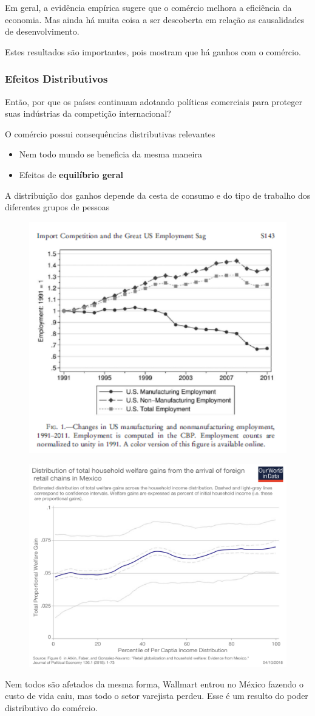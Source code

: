 \documentclass[a4paper,12pt]{article}[abntex2]
\begin{document}
Em geral, a evidência empírica sugere que o comércio melhora a eficiência da economia. Mas ainda há muita coisa a ser descoberta em relação as causalidades de desenvolvimento.

Estes resultados são importantes, pois mostram que há ganhos com o comércio.

\subsubsection{\textbf{Efeitos Distributivos}}
Então, por que os países continuam adotando políticas comerciais para proteger suas indústrias da competição internacional?

O comércio possui consequências distributivas relevantes\begin{itemize}
    \item Nem todo mundo se beneficia da mesma maneira
    \item Efeitos de \textbf{equilíbrio geral}
\end{itemize}

A distribuição dos ganhos depende da cesta de consumo e do tipo de trabalho dos diferentes grupos de pessoas

\begin{figure}[H]
    \centering
    \includegraphics[width=0.70\linewidth]{Imagens/a1i14.png}
\end{figure}

\begin{figure}[H]
    \centering
    \includegraphics[width=0.70\linewidth]{Imagens/a1i15.png}
\end{figure}
Nem todos são afetados da mesma forma, Wallmart entrou no México fazendo o custo de vida caiu, mas todo o setor varejista perdeu. Esse é um resulto do poder distributivo do comércio. 
\newpage
\end{document}

